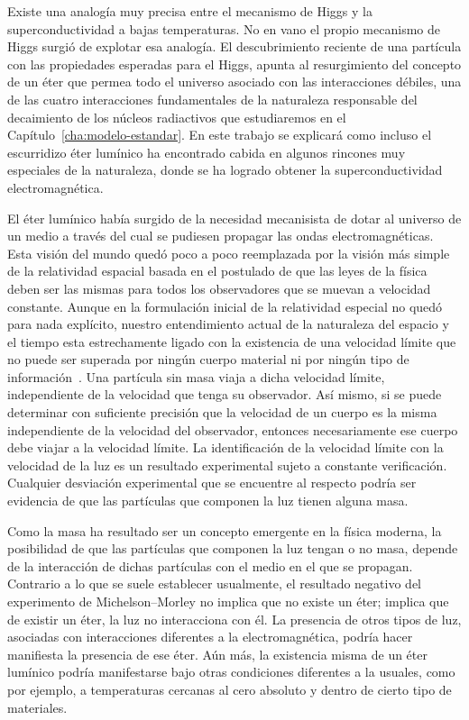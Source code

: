 Existe una analogía muy precisa entre el mecanismo de Higgs y la superconductividad a bajas temperaturas. No en vano el propio mecanismo de Higgs surgió de explotar esa analogía. El descubrimiento reciente de una partícula con las propiedades esperadas para el Higgs, apunta al resurgimiento del concepto de  un éter que permea todo el universo asociado con las interacciones débiles, una de las cuatro interacciones fundamentales de la naturaleza responsable del decaimiento de los núcleos radiactivos que estudiaremos en el Capítulo~\ref{cha:modelo-estandar}. En este trabajo se explicará como incluso el escurridizo éter lumínico ha encontrado cabida en algunos rincones muy especiales de la naturaleza, donde se ha logrado obtener la superconductividad electromagnética.   

El éter lumínico había surgido de la necesidad mecanisista de dotar al universo de un medio a través del cual se pudiesen propagar las ondas electromagnéticas. Esta visión del mundo quedó poco a poco reemplazada por la visión más simple de la relatividad espacial basada en el postulado de que las leyes de la física deben ser las mismas para todos los observadores que se muevan a velocidad constante. Aunque en la formulación inicial de la relatividad especial no quedó para nada explícito, nuestro entendimiento actual de la naturaleza del espacio y el tiempo esta estrechamente ligado con la existencia de una velocidad límite que no puede ser superada por ningún cuerpo material ni por ningún tipo de información~\cite{Silagadze:2007eb}. Una partícula sin masa viaja a dicha velocidad límite, independiente de la velocidad que tenga su observador. Así mismo, si se puede determinar con suficiente precisión que la velocidad de un cuerpo es la misma independiente de la velocidad del observador, entonces necesariamente ese cuerpo debe viajar a la velocidad límite. La identificación de la velocidad límite con la velocidad de la luz es un resultado experimental sujeto a constante verificación. Cualquier desviación experimental que se encuentre al respecto podría ser evidencia de que las partículas que componen la luz tienen alguna masa.

Como la masa ha resultado ser un concepto emergente en la física moderna, la posibilidad de que las partículas que componen la luz tengan o no masa, depende de la interacción de dichas partículas con el medio en el que se propagan. Contrario a lo que se suele establecer usualmente, el resultado negativo del experimento de Michelson--Morley no implica que no existe un éter; implica que de existir un éter, la luz no interacciona con él. La presencia de otros tipos de luz, asociadas con interacciones diferentes a la electromagnética, podría hacer manifiesta la presencia de ese éter.  Aún más, la existencia misma de un éter lumínico podría manifestarse bajo otras condiciones diferentes a la usuales, como por ejemplo, a temperaturas cercanas al cero absoluto y dentro de cierto tipo de materiales.

